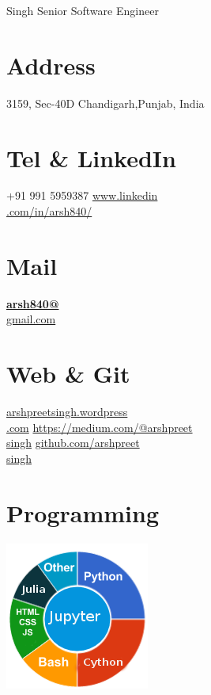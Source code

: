 \documentclass[]{friggeri-cv}
\begin{document}
     {Singh}
      {Senior Software Engineer}


\begin{aside}
  \section{Address}
    3159, Sec-40D
    Chandigarh,Punjab, India
    ~
  \section{Tel \& LinkedIn}
    +91 991 5959387
    \href{http://www.linkedin.com/in/arsh840/}{www.linkedin\\.com/in/arsh840/}
    ~
  \section{Mail}
    \href{mailto:arsh840@gmail.com}{\textbf{arsh840@}\\gmail.com}
    ~
  \section{Web \& Git}
    \href{http://www.arshpreetsingh.wordpress.com}{arshpreetsingh.wordpress\\.com}
    \href{https://medium.com/@arshpreetsingh}{https://medium.com/@arshpreet\\singh}
    \href{https://github.com/arshpreetsingh}{github.com/arshpreet\\singh}
    ~
  \section{Programming}
    \includegraphics[scale=0.62]{img/programming.png}
    ~

\end{aside}
\end{document}
